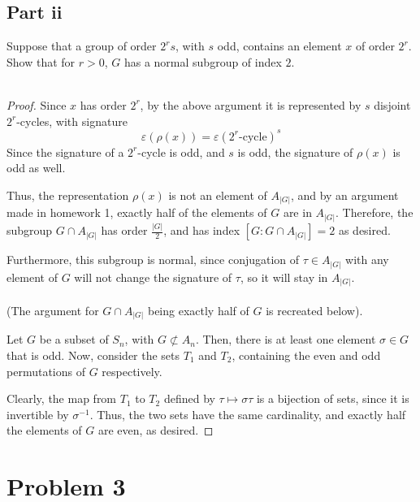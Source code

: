 \documentclass[12pt,reqno]{amsart}
\newcommand{\inv}{^{-1}}
\begin{document}
\subsection*{Part ii}
Suppose that a group of order $2^rs$, with $s$ odd, contains an element $x$ of
order $2^r$. Show that for $r>0$, $G$ has a normal subgroup of index $2$.
\\
\\
\begin{proof}
    Since $x$ has order $2^r$, by the above argument it is represented by
    $s$ disjoint $2^r$-cycles, with signature 
    \[
        \varepsilon(\rho(x)) = \varepsilon(2^r\textrm{-cycle})^s
    \]
    Since the signature of a $2^r$-cycle is odd, and $s$ is odd, the signature
    of $\rho(x)$ is odd as well.

    Thus, the representation $\rho(x)$ is not an element of $A_{|G|}$, and by
    an argument made in homework 1, exactly half of the elements of $G$
    are in $A_{|G|}$. Therefore, the subgroup $G\cap A_{|G|}$ has order
    $\frac{|G|}{2}$, and has index $[G:G\cap A_{|G|}] = 2$ as desired.
    
    Furthermore, this subgroup is normal, since conjugation of $\tau\in
    A_{|G|}$ with any element of $G$ will not change the signature of $\tau$, so
    it will stay in $A_{|G|}$.
    \\
    \\
    (The argument for $G\cap A_{|G|}$ being exactly half of $G$ is recreated
    below).

    Let $G$ be a subset of $S_n$, with $G\not\subset A_n$. Then, there is
    at least one element $\sigma\in G$ that is odd. Now, consider the sets
    $T_1$ and $T_2$, containing the even and odd permutations of $G$
    respectively.
    
    Clearly, the map from $T_1$ to $T_2$ defined by $\tau\mapsto\sigma\tau$
    is a bijection of sets, since it is invertible by $\sigma\inv$.
    Thus, the two sets have the same cardinality, and exactly half the elements
    of $G$ are even, as desired.
\end{proof}

\newpage

\section*{Problem 3}
\end{document}
